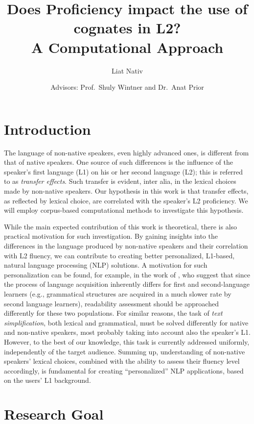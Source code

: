 \documentclass[11pt]{article}
\title{Does Proficiency impact the use of cognates in L2?\\[.5em]A Computational Approach}
\author{Liat Nativ \and Advisors: Prof.\ Shuly Wintner and Dr.\ Anat Prior}
\date{}
\begin{document}
\maketitle
\thispagestyle{empty}

\section{Introduction}

The language of non-native speakers, even highly advanced ones, is different from that of native speakers. One source of such differences is the influence of the speaker's first language (L1) on his or her second language (L2); this is referred to as \emph{transfer effects}. Such transfer is evident, inter alia, in the lexical choices made by non-native speakers. 
%
Our hypothesis in this work is that transfer effects, as reflected by lexical choice, are correlated with the speaker's L2 proficiency. We will employ corpus-based computational methods to investigate this hypothesis.

While the main expected contribution of this work is theoretical, there is also practical motivation for such investigation. By gaining insights into the differences in the language produced by non-native speakers and their correlation with L2 fluency, we can contribute to creating better personalized, L1-based, natural language processing (NLP) solutions. 
A motivation for such personalization can be found, for example, in the work of \cite{heilman-etal-2007-combining},
who suggest that since the process of language 
acquisition inherently differs for first and second-language learners (e.g., grammatical structures are acquired in a much slower rate by second language learners), 
readability assessment should be approached differently for these two populations. 
For similar reasons, the task of \emph{text simplification}, both lexical and grammatical, must be solved differently for native and non-native speakers, most probably taking into account also the speaker's L1. However, to the best of our knowledge, this task is currently addressed uniformly, independently of the target audience.
Summing up, understanding of non-native speakers' lexical choices, combined with the ability to assess their fluency level accordingly,
is fundamental for creating ``personalized'' NLP applications, based on the users' L1 background.

\section{Research Goal}
\end{document}
